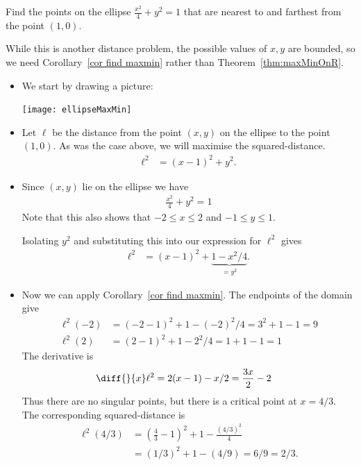 \begin{eg}\label{APPglobalMaxMinDD}
Find the points on the ellipse $\frac{x^2}{4}+y^2=1$ that are nearest
to and farthest from the point $(1,0)$.


\soln While this is another distance problem, the possible values of $x,y$ are bounded,
so we need Corollary~\ref{cor find maxmin} rather than Theorem~\ref{thm:maxMinOnR}.
\begin{itemize}
 \item We start by drawing a picture:
\begin{efig}
\begin{center}
   \texttt{[image: ellipseMaxMin]}
\end{center}
\end{efig}
\item Let $\ell$ be the distance from the point $(x,y)$ on the ellipse to the point
$(1,0)$. As was the case above, we will maximise the squared-distance.
\begin{align*}
  \ell^2 &= (x-1)^2 + y^2.
\end{align*}
\item Since $(x,y)$ lie on the ellipse we have
\begin{align*}
\frac{x^2}{4}+y^2=1
\end{align*}
Note that this also shows that $-2 \leq x \leq 2$ and $-1 \leq y \leq 1$.


Isolating $y^2$ and substituting this into our expression for $\ell^2$ gives
\begin{align*}
  \ell^2 &= (x-1)^2 + \underbrace{1-x^2/4}_{=y^2}.
\end{align*}

\item Now we can apply Corollary~\ref{cor find maxmin}. The endpoints of the domain give
\begin{align*}
  \ell^2(-2) &= (-2-1)^2 + 1 - (-2)^2/4 = 3^2+1-1 = 9\\
  \ell^2(2) &= (2-1)^2 + 1 - 2^2/4 = 1+1-1 = 1
\end{align*}
The derivative is
\begin{align*}
  \diff{}{x} \ell^2 &= 2(x-1) - x/2 = \frac{3x}{2} - 2
\end{align*}
Thus there are no singular points, but there is a critical point at $x = 4/3$. The
corresponding squared-distance is
\begin{align*}
  \ell^2(4/3) &= \left( \frac{4}{3}-1\right)^2 +1 - \frac{(4/3)^2}{4} \\
  &= (1/3)^2 + 1 - (4/9) = 6/9 = 2/3.
\end{align*}


\end{itemize}
\end{eg}
